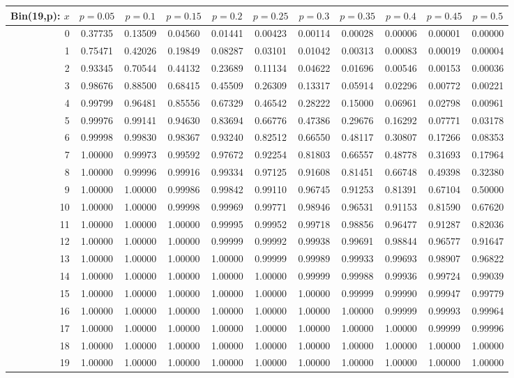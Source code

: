 \documentclass{article}
\begin{document}
{\vspace{8pt minus 6pt}
\begin{tabular}{@{\extracolsep{-2pt}}|r|c|c|c|c|c|c|c|c|c|c|}
\hline
Bin(19,p): $x$
   & $p\!=\!0.05$& $p\!=\!0.1$& $p\!=\!0.15$& $p\!=\!0.2$& $p\!=\!0.25$& $p\!=\!0.3$& $p\!=\!0.35$& $p\!=\!0.4$& $p\!=\!0.45$& $p\!=\!0.5$\\\hline
  0&0.37735&0.13509&0.04560&0.01441&0.00423&0.00114&0.00028&0.00006&0.00001&0.00000\\
  1&0.75471&0.42026&0.19849&0.08287&0.03101&0.01042&0.00313&0.00083&0.00019&0.00004\\
  2&0.93345&0.70544&0.44132&0.23689&0.11134&0.04622&0.01696&0.00546&0.00153&0.00036\\
  3&0.98676&0.88500&0.68415&0.45509&0.26309&0.13317&0.05914&0.02296&0.00772&0.00221\\
  4&0.99799&0.96481&0.85556&0.67329&0.46542&0.28222&0.15000&0.06961&0.02798&0.00961\\
  5&0.99976&0.99141&0.94630&0.83694&0.66776&0.47386&0.29676&0.16292&0.07771&0.03178\\
  6&0.99998&0.99830&0.98367&0.93240&0.82512&0.66550&0.48117&0.30807&0.17266&0.08353\\
  7&1.00000&0.99973&0.99592&0.97672&0.92254&0.81803&0.66557&0.48778&0.31693&0.17964\\
  8&1.00000&0.99996&0.99916&0.99334&0.97125&0.91608&0.81451&0.66748&0.49398&0.32380\\
  9&1.00000&1.00000&0.99986&0.99842&0.99110&0.96745&0.91253&0.81391&0.67104&0.50000\\
 10&1.00000&1.00000&0.99998&0.99969&0.99771&0.98946&0.96531&0.91153&0.81590&0.67620\\
 11&1.00000&1.00000&1.00000&0.99995&0.99952&0.99718&0.98856&0.96477&0.91287&0.82036\\
 12&1.00000&1.00000&1.00000&0.99999&0.99992&0.99938&0.99691&0.98844&0.96577&0.91647\\
 13&1.00000&1.00000&1.00000&1.00000&0.99999&0.99989&0.99933&0.99693&0.98907&0.96822\\
 14&1.00000&1.00000&1.00000&1.00000&1.00000&0.99999&0.99988&0.99936&0.99724&0.99039\\
 15&1.00000&1.00000&1.00000&1.00000&1.00000&1.00000&0.99999&0.99990&0.99947&0.99779\\
 16&1.00000&1.00000&1.00000&1.00000&1.00000&1.00000&1.00000&0.99999&0.99993&0.99964\\
 17&1.00000&1.00000&1.00000&1.00000&1.00000&1.00000&1.00000&1.00000&0.99999&0.99996\\
 18&1.00000&1.00000&1.00000&1.00000&1.00000&1.00000&1.00000&1.00000&1.00000&1.00000\\
 19&1.00000&1.00000&1.00000&1.00000&1.00000&1.00000&1.00000&1.00000&1.00000&1.00000\\
\hline
\end{tabular}

}
\end{document}
